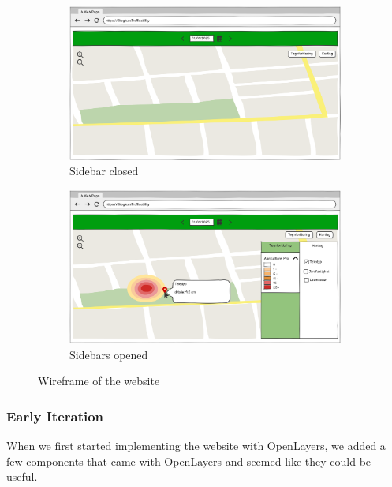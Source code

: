 \begin{figure}[h]
     \centering
     \begin{subfigure}[b]{0.45\textwidth}
         \centering
         \includegraphics[width=\textwidth]{figures/wireframe_website_sidebars_closed.pdf}
         \caption{Sidebar closed}
         \label{fig:wireframe:closed}
     \end{subfigure}
     \hfill
     \begin{subfigure}[b]{0.45\textwidth}
         \centering
         \includegraphics[width=\textwidth]{figures/wireframe_website_sidebars_opened.pdf}
         \caption{Sidebars opened}
         \label{fig:wireframe:opened}
     \end{subfigure}
    \caption{Wireframe of the website}
    \label{fig:wireframe}
\end{figure}

\subsubsection*{Early Iteration}

When we first started implementing the website with OpenLayers, we added a few components that came with OpenLayers and seemed like they could be useful. 

